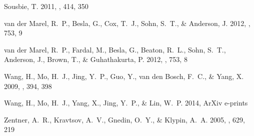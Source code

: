 \documentclass{emulateapj}
\begin{document}
\begin{thebibliography}{38}
{Sousbie}, T. 2011, \mnras, 414, 350

{van der Marel}, R.~P., {Besla}, G., {Cox}, T.~J., {Sohn}, S.~T., \&
  {Anderson}, J. 2012{}, \apj, 753, 9

{van der Marel}, R.~P., {Fardal}, M., {Besla}, G., {Beaton}, R.~L., {Sohn},
  S.~T., {Anderson}, J., {Brown}, T., \& {Guhathakurta}, P. 2012{},
  \apj, 753, 8

{Wang}, H., {Mo}, H.~J., {Jing}, Y.~P., {Guo}, Y., {van den Bosch}, F.~C., \&
  {Yang}, X. 2009, \mnras, 394, 398

{Wang}, H., {Mo}, H.~J., {Yang}, X., {Jing}, Y.~P., \& {Lin}, W.~P. 2014, ArXiv
  e-prints

{Zentner}, A.~R., {Kravtsov}, A.~V., {Gnedin}, O.~Y., \& {Klypin}, A.~A. 2005,
  \apj, 629, 219

\end{thebibliography}
\end{document}
